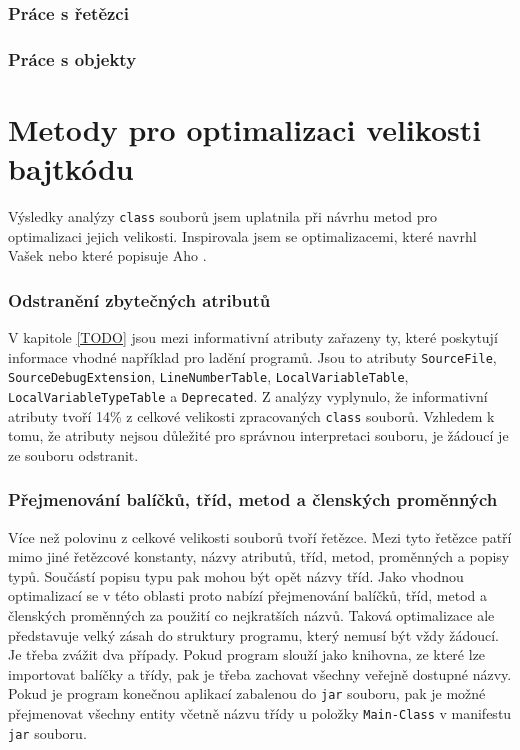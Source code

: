 \subsubsection{Práce s řetězci}


\subsubsection{Práce s objekty}

\section{Metody pro optimalizaci velikosti bajtkódu}\label{Analysis}

Výsledky analýzy \texttt{class} souborů jsem uplatnila při návrhu metod pro optimalizaci jejich velikosti. Inspirovala jsem se optimalizacemi, které navrhl Vašek \cite{TODO} nebo které popisuje Aho \cite{TODO}.

\subsubsection{Odstranění zbytečných atributů}
V kapitole \ref{TODO} jsou mezi informativní atributy zařazeny ty, které poskytují informace vhodné například pro ladění programů. Jsou to atributy \texttt{SourceFile}, \texttt{SourceDebugExtension}, \texttt{LineNumberTable}, \texttt{LocalVariableTable}, \texttt{LocalVariableTypeTable} a \texttt{Deprecated}.  Z analýzy vyplynulo, že informativní atributy tvoří 14\% z celkové velikosti zpracovaných \texttt{class} souborů. Vzhledem k tomu, že atributy nejsou důležité pro správnou interpretaci souboru, je žádoucí je ze souboru odstranit.

\subsubsection{Přejmenování balíčků, tříd, metod a členských proměnných}
Více než polovinu z celkové velikosti souborů tvoří řetězce. Mezi tyto řetězce patří mimo jiné řetězcové konstanty, názvy atributů, tříd, metod, proměnných a popisy typů. Součástí popisu typu pak mohou být opět názvy tříd. Jako vhodnou optimalizací se v této oblasti proto nabízí přejmenování balíčků, tříd, metod a členských proměnných za použití co nejkratších názvů. Taková optimalizace ale představuje velký zásah do struktury programu, který nemusí být vždy žádoucí. Je třeba zvážit dva případy. Pokud program slouží jako knihovna, ze které lze importovat balíčky a třídy, pak je třeba zachovat všechny veřejně dostupné názvy. Pokud je program konečnou aplikací zabalenou do \texttt{jar} souboru, pak je možné přejmenovat všechny entity včetně názvu třídy u položky \texttt{Main-Class} v manifestu \texttt{jar} souboru.

